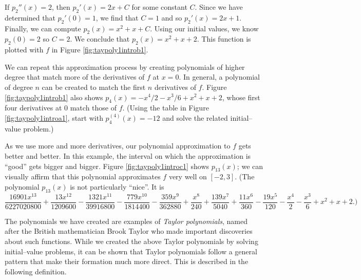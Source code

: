 If $p_2''(x) = 2$, then $p_2'(x) = 2x+C$ for some constant $C$. Since we have determined that $p_2'(0) = 1$, we find that $C=1$ and so $p_2'(x) = 2x+1$. Finally, we can compute $p_2(x) = x^2+x+C$. Using our initial values, we know $p_2(0) = 2$ so $C=2.$ We conclude that $p_2(x) = x^2+x+2.$ This function is plotted with $f$ in Figure \ref{fig:taypoly1introb1}.


We can repeat this approximation process by creating polynomials of higher degree that match more of the derivatives of $f$ at $x=0$. In general, a polynomial of degree $n$ can be created to match the first $n$ derivatives of $f$. Figure \ref{fig:taypoly1introb1} also shows $p_4(x)= -x^4/2-x^3/6+x^2+x+2$, whose first four derivatives at 0 match those of $f$. (Using the table in Figure \ref{fig:taypoly1introa1}, start with $p_4^{(4)}(x)=-12$ and solve the related initial--value problem.)

As we use more and more derivatives, our polynomial approximation to $f$ gets better and better. In this example, the interval on which the approximation is ``good'' gets bigger and bigger. Figure \ref{fig:taypoly1introc1} shows $p_{13}(x)$; we can visually affirm that this polynomial approximates $f$ very well on $[-2,3]$. (The polynomial $p_{13}(x)$ is not particularly ``nice''. It is {\scriptsize $$ \frac{16901x^{13}}{6227020800}+\frac{13x^{12}}{1209600}-\frac{1321x^{11}}{39916800}-\frac{779x^{10}}{1814400}-\frac{359x^9}{362880}+\frac{x^8}{240}+\frac{139x^7}{5040}+\frac{11 x^6}{360}-\frac{19x^5}{120}-\frac{x^4}{2}-\frac{x^3}{6}+x^2+x+2.)$$}

The polynomials we have created are examples of \emph{Taylor polynomials}, named after the British mathematician Brook Taylor who made important discoveries about such functions. While we created the above Taylor polynomials by solving initial--value problems, it can be shown that Taylor polynomials follow a general pattern that make their formation much more direct. This is described in the following definition.

